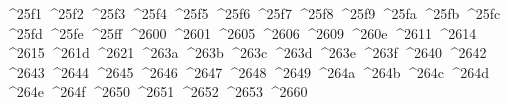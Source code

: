 {  ^^^^25f1%
  ^^^^25f2%
  ^^^^25f3%
  ^^^^25f4%
  ^^^^25f5%
  ^^^^25f6%
  ^^^^25f7%
  ^^^^25f8%
  ^^^^25f9%
  ^^^^25fa%
  ^^^^25fb%
  ^^^^25fc%
  ^^^^25fd%
  ^^^^25fe%
  ^^^^25ff%
  ^^^^2600%
  ^^^^2601%
  ^^^^2605%
  ^^^^2606%
  ^^^^2609%
  ^^^^260e%
  ^^^^2611%
  ^^^^2614%
  ^^^^2615%
  ^^^^261d%
  ^^^^2621%
  ^^^^263a%
  ^^^^263b%
  ^^^^263c%
  ^^^^263d%
  ^^^^263e%
  ^^^^263f%
  ^^^^2640%
  ^^^^2642%
  ^^^^2643%
  ^^^^2644%
  ^^^^2645%
  ^^^^2646%
  ^^^^2647%
  ^^^^2648%
  ^^^^2649%
  ^^^^264a%
  ^^^^264b%
  ^^^^264c%
  ^^^^264d%
  ^^^^264e%
  ^^^^264f%
  ^^^^2650%
  ^^^^2651%
  ^^^^2652%
  ^^^^2653%
  ^^^^2660%
}
